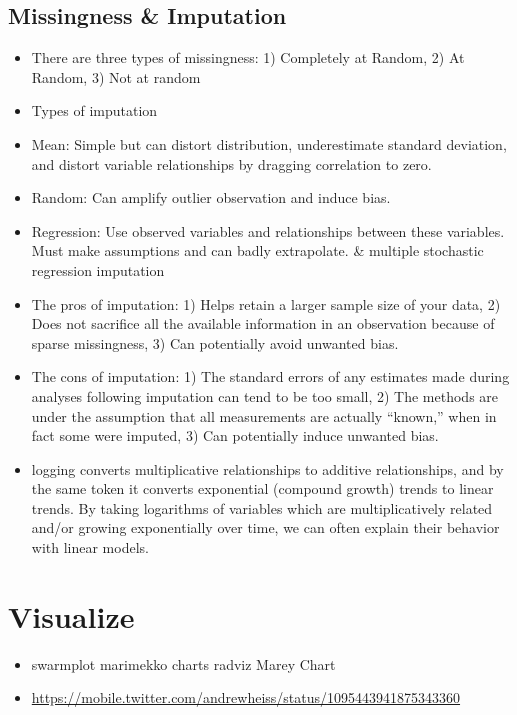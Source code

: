 \documentclass[]{book}
\begin{document}
\subsection{Missingness \& Imputation}\label{missingness-imputation}

\begin{itemize}
\item
  There are three types of missingness: 1) Completely at Random, 2) At
  Random, 3) Not at random
\item
  Types of imputation
\item
  Mean: Simple but can distort distribution, underestimate standard
  deviation, and distort variable relationships by dragging correlation
  to zero.
\item
  Random: Can amplify outlier observation and induce bias.
\item
  Regression: Use observed variables and relationships between these
  variables. Must make assumptions and can badly extrapolate. \&
  multiple stochastic regression imputation
\item
  The pros of imputation: 1) Helps retain a larger sample size of your
  data, 2) Does not sacrifice all the available information in an
  observation because of sparse missingness, 3) Can potentially avoid
  unwanted bias.
\item
  The cons of imputation: 1) The standard errors of any estimates made
  during analyses following imputation can tend to be too small, 2) The
  methods are under the assumption that all measurements are actually
  ``known,'' when in fact some were imputed, 3) Can potentially induce
  unwanted bias.
\item
  logging converts multiplicative relationships to additive
  relationships, and by the same token it converts exponential (compound
  growth) trends to linear trends. By taking logarithms of variables
  which are multiplicatively related and/or growing exponentially over
  time, we can often explain their behavior with linear models.
\end{itemize}

\section{Visualize}\label{visualize-1}

\begin{itemize}
\item
  swarmplot \textbar{} marimekko charts \textbar{} radviz \textbar{}
  Marey Chart
\item
  \url{https://mobile.twitter.com/andrewheiss/status/1095443941875343360}
\end{itemize}
\end{document}
